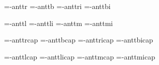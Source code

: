 
\ifx\sizespec\undefined \def\sizespec{}\fi
\ifx\font\corkencoded {}\else {}\fi


\font\tenrm=\tmp-anttr  \sizespec
\font\tenbf=\tmp-anttb  \sizespec
\font\tenit=\tmp-anttri \sizespec
\font\tenbi=\tmp-anttbi \sizespec

\font\tenlr=\tmp-anttl  \sizespec  \def\lr{\tenlr}
\font\tenli=\tmp-anttli \sizespec  \def\li{\tenli}
\font\tenmr=\tmp-anttm  \sizespec  \def\mr{\tenmr}
\font\tenmi=\tmp-anttmi \sizespec  \def\mi{\tenmi}

\font\tenrmc=\tmp-anttrcap  \sizespec
\font\tenbfc=\tmp-anttbcap  \sizespec
\font\tenitc=\tmp-anttricap \sizespec
\font\tenbic=\tmp-anttbicap \sizespec

\font\tenlrc=\tmp-anttlcap  \sizespec 
\font\tenlic=\tmp-anttlicap \sizespec
\font\tenmrc=\tmp-anttmcap  \sizespec
\font\tenmic=\tmp-anttmicap \sizespec

\tenrm


\def\caps#1{{\escapechar=-1 \expandafter}%
  \expandafter\csname\expandafter\tenonlytext\string#1c\endcsname}
\def\tenonlytext{ten}

\ifx\regfont\undefined \else
   \regfont\tenlr  \regfont\tenli
   \regfont\tenmr  \regfont\tenmi
   \regfont\tenrmc \regfont\tenitc
   \regfont\tenbfc \regfont\tenbic
   \regfont\tenlrc \regfont\tenlic
   \regfont\tenmrc \regfont\tenmic
\fi

\def\txr{cs-anttr} \def\txmi{mi-anttri} 
\def\txb{cs-anttb} \def\txbi{mi-anttbi}
\ifx\normalTXmath\undefined  \else\normalTXmath \fi

\ifx\font\corkencoded \else  \fi

